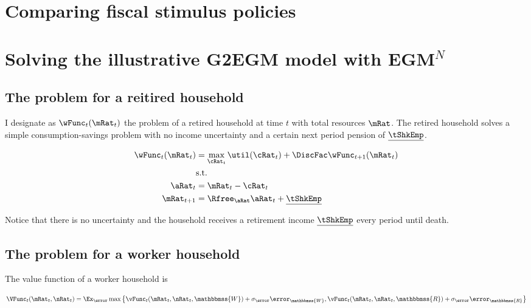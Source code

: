 \documentclass[\econtexRoot/EGMN]{subfiles}
\begin{document}
\FloatBarrier
\hypertarget{comparing-fiscal-stimulus-policies}{}\par\section{Comparing fiscal stimulus policies}
\notinsubfile{\label{sec:comparing}}

\section{Solving the illustrative G2EGM model with EGM$^N$}

\subsection{The problem for a reitired household}

I designate as $\wFunc_{t}(\mRat_{t})$ the problem of a retired household at time $t$ with total resources $\mRat$. The retired household solves a simple consumption-savings problem with no income uncertainty and a certain next period pension of $\underline{\tShkEmp}$.

\begin{equation}
  \begin{split}
    \wFunc_{t}(\mRat_{t}) & = \max_{\cRat_{t}} \util(\cRat_{t}) +
    \DiscFac \wFunc_{t+1}(\mRat_{t}) \\
    & \text{s.t.} \\
    \aRat_{t} & = \mRat_{t} - \cRat_{t} \\
    \mRat_{t+1} & = \Rfree_{\aRat} \aRat_{t} +
    \underline{\tShkEmp}
  \end{split}
\end{equation}

Notice that there is no uncertainty and the household receives a retirement
income $\underline{\tShkEmp}$ every period until death.

\subsection{The problem for a worker household}

The value function of a worker household is

\providecommand{\Work}{\ensuremath{\mathbbmss{W}}}
\providecommand{\Retire}{\ensuremath{\mathbbmss{R}}}

\begin{equation}
  \VFunc_{t}(\mRat_{t}, \nRat_{t}) = \Ex_\error \max \left\{
  \vFunc_{t}(\mRat_{t}, \nRat_{t}, \Work) + \sigma_{\error}
  \error_{\Work} ,
  \vFunc_{t}(\mRat_{t}, \nRat_{t}, \Retire) + \sigma_{\error}
  \error_{\Retire} \right\}
\end{equation}
\end{document}
